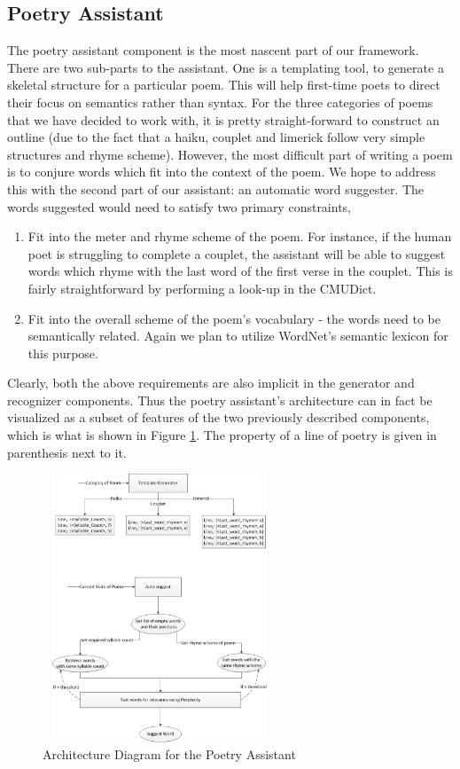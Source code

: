 \documentclass[10pt, letter,twocolumn]{IEEEtran}
\begin{document}
\subsection{Poetry Assistant} 
The poetry assistant component is the most nascent part of our framework. There are two sub-parts to the assistant. One is a templating tool, to generate a skeletal structure for a particular poem. This will help first-time poets to direct their focus on semantics rather than syntax. For the three categories of poems that we have decided to work with, it is pretty straight-forward to construct an outline (due to the fact that a haiku, couplet and limerick follow very simple structures and rhyme scheme). However, the most difficult part of writing a poem is to conjure words which fit into the context of the poem. We hope to address this with the second part of our assistant: an automatic word suggester. The words suggested would need to satisfy two primary constraints,
\begin{enumerate}
	\item Fit into the meter and rhyme scheme of the poem. For instance, if the human poet is struggling to complete a couplet, the assistant will be able to suggest words which rhyme with the last word of the first verse in the couplet. This is fairly straightforward by performing a look-up in the CMUDict.
	\item Fit into the overall scheme of the poem's vocabulary - the words need to be semantically related. Again we plan to utilize WordNet's semantic lexicon for this purpose.
\end{enumerate}
Clearly, both the above requirements are also implicit in the generator and recognizer components. Thus the poetry assistant's architecture can in fact be visualized as a subset of features of the two previously described components, which is what is shown in Figure \ref{architecture4}. The property of a line of poetry is given in parenthesis next to it.

\begin{figure}[ht]
  \centering
    \includegraphics[width=7cm, height=8cm]{Images/arch4}
    \caption{Architecture Diagram for the Poetry Assistant}
  \label{architecture4}
\end{figure}
\end{document}
